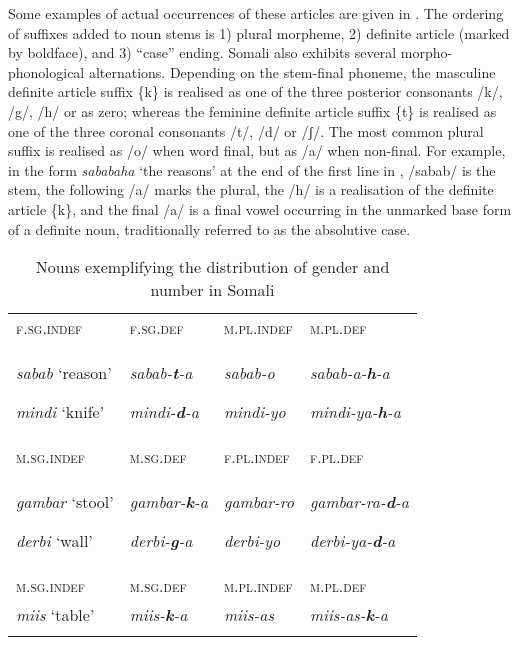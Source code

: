 \documentclass[output=paper]{langsci/langscibook}
\begin{document}
Some examples of actual occurrences of these articles are given in . The ordering of suffixes added to noun stems is 1) plural morpheme, 2) definite article (marked by boldface), and 3) “case” ending. Somali also exhibits several morpho-phonological alternations. Depending on the stem-final phoneme, the masculine definite article suffix \{k\} is realised as one of the three posterior consonants /k/, /g/, /h/ or as zero; whereas the feminine definite article suffix \{t\} is realised as one of the three coronal consonants /t/, /d/ or /ʃ/. The most common plural suffix is realised as /o/ when word final, but as /a/ when non-final. For example, in the form \textit{sababaha} ‘the reasons’ at the end of the first line in , /sabab/ is the stem, the following /a/ marks the plural, the /h/ is a realisation of the definite article \{k\}, and the final /a/ is a final vowel occurring in the unmarked base form of a definite noun, traditionally referred to as the absolutive case.
 
\begin{table}
\caption{Nouns exemplifying the distribution of gender and number in Somali}
\label{tab:2}

\begin{tabularx}{\textwidth}{XXXX}
\lsptoprule
{\textsc{f.sg.indef}} & {\textsc{f.sg.def}} & {\textsc{m.pl.indef}} & {\textsc{m.pl.def}}\\
{\textit{sabab} ‘reason’}

{\textit{mindi} ‘knife’} & {\textit{sabab-}\textbf{\textit{t}}\textit{{}-a}}

{\textit{mindi-}\textbf{\textit{d}}\textit{{}-a}} & {\textit{sabab-o}}

{\textit{mindi-yo}} & {\textit{sabab-a-}\textbf{\textit{h}}\textit{{}-a}}

{\textit{mindi-ya-}\textbf{\textit{h}}\textit{{}-a}}\\
{\textsc{m.sg.indef}} & {\textsc{m.sg.def}} & {\textsc{f.pl.indef}} & {\textsc{f.pl.def}}\\
{\textit{gambar} ‘stool’}

{\textit{derbi} ‘wall’} & {\textit{gambar-}\textbf{\textit{k}}\textit{{}-a}}

{\textit{derbi-}\textbf{\textit{g}}\textit{{}-a}} & {\textit{gambar-ro}}

{\textit{derbi-yo}} & {\textit{gambar-ra-}\textbf{\textit{d}}\textit{{}-a}}

{\textit{derbi-ya-}\textbf{\textit{d}}\textit{{}-a}}\\
{\textsc{m.sg.indef}} & {\textsc{m.sg.def}} & {\textsc{m.pl.indef}} & {\textsc{m.pl.def}}\\
{\textit{miis} ‘table’} & {\textit{miis-}\textbf{\textit{k}}\textit{{}-a}} & {\textit{miis-as}} & {\textit{miis-as-}\textbf{\textit{k}}\textit{{}-a}}\\
\lspbottomrule
\end{tabularx}

\end{table} 
\end{document}
